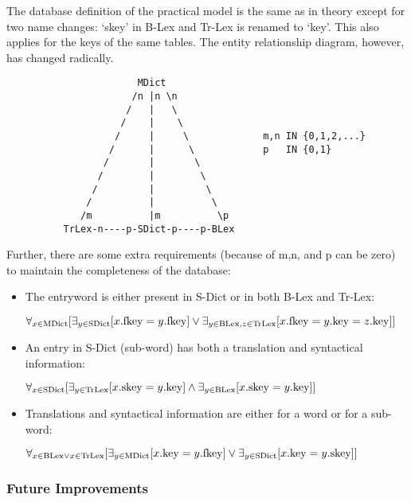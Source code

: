 The database definition of the practical model is the same as in theory except 
for two name changes: `skey' in B-Lex and Tr-Lex is renamed to `key'. This
also applies for the keys of the same tables. The entity relationship diagram,
however, has changed radically.

\begin{verbatim}
                       MDict
                      /n |n \n
                     /   |   \
                    /    |    \
                   /     |     \             m,n IN {0,1,2,...}
                  /      |      \            p   IN {0,1}
                 /       |       \
                /        |        \
               /         |         \
              /          |          \
             /m          |m          \p
          TrLex-n----p-SDict-p----p-BLex
\end{verbatim}

Further, there are some extra requirements (because of m,n, and p can be zero)
to maintain the completeness of the database:

\begin{itemize}
  \item The entryword is either present in S-Dict or in both B-Lex and Tr-Lex:

        $ \forall_{x \in {\rm MDict}} [
             \exists_{y \in {\rm SDict}} [ x.{\rm fkey} = y.{\rm fkey} ] \vee
             \exists_{y \in {\rm BLex}, z \in {\rm TrLex}}
                    [ x.{\rm fkey} = y.{\rm key} = z.{\rm key} ] ]
        $
  \item An entry in S-Dict (sub-word) has both a translation and syntactical 
        information:

        $ \forall_{x \in {\rm SDict}} [
             \exists_{y \in {\rm TrLex}} [ x.{\rm skey} = y.{\rm key} ] \wedge
             \exists_{y \in {\rm BLex}}  [ x.{\rm skey} = y.{\rm key} ] ]
        $
  \item Translations and syntactical information are either for a word or for a 
        sub-word:

        $ \forall_{x \in {\rm BLex} \vee x \in {\rm TrLex}} [
             \exists_{y \in {\rm MDict}} [ x.{\rm key} = y.{\rm fkey} ] \vee
             \exists_{y \in {\rm SDict}} [ x.{\rm key} = y.{\rm skey} ] ]
        $\\
\end{itemize}

\subsubsection{Future Improvements}

